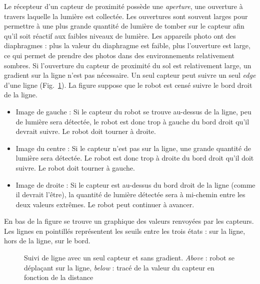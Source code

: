 {Le récepteur d'un capteur de proximité possède une \emph{aperture}, une ouverture à travers laquelle la lumière est collectée. Les ouvertures sont souvent larges pour permettre à une plus grande quantité de lumière de tomber sur le capteur afin qu'il soit réactif aux faibles niveaux de lumière. Les appareils photo ont des diaphragmes : plus la valeur du diaphragme est faible, plus l'ouverture est large, ce qui permet de prendre des photos dans des environnements relativement sombres. Si l'ouverture du capteur de proximité du sol est relativement large, un gradient sur la ligne n'est pas nécessaire. Un seul capteur peut suivre un seul \emph{edge} d'une ligne (Fig.~\ref{fig.no-gradient}). La figure suppose que le robot est censé suivre le bord droit de la ligne.
\begin{itemize}
\item Image de gauche : Si le capteur du robot se trouve au-dessus de la ligne, peu de lumière sera détectée, le robot est donc trop à gauche du bord droit qu'il devrait suivre. Le robot doit tourner à droite.
\item Image du centre : Si le capteur n'est pas sur la ligne, une grande quantité de lumière sera détectée. Le robot est donc trop à droite du bord droit qu'il doit suivre. Le robot doit tourner à gauche.
\item Image de droite : Si le capteur est au-dessus du bord droit de la ligne (comme il devrait l'être), la quantité de lumière détectée sera à mi-chemin entre les deux valeurs extrêmes. Le robot peut continuer à avancer.
\end{itemize}
En bas de la figure se trouve un graphique des valeurs renvoyées par les capteurs. Les lignes en pointillés représentent les seuils entre les trois états : sur la ligne, hors de la ligne, sur le bord.

\begin{figure}
\begin{center}
\caption{Suivi de ligne avec un seul capteur et sans gradient. \textit{Above} : robot se déplaçant sur la ligne, \textit{below} : tracé de la valeur du capteur en fonction de la distance}\label{fig.no-gradient}
\end{center}
\end{figure}

}
